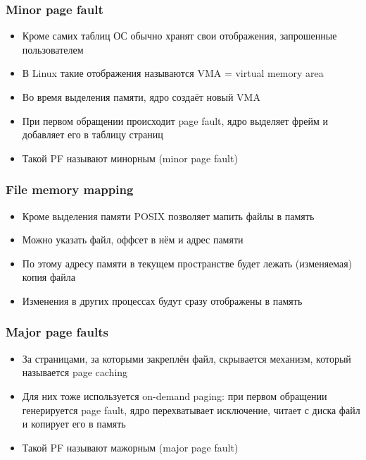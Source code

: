     \subsubsection{Minor page fault}
      \begin{itemize}
        \item Кроме самих таблиц ОС обычно хранят свои отображения, запрошенные пользователем
        \item В Linux такие отображения называются VMA = virtual memory area
        \item Во время выделения памяти, ядро создаёт новый VMA
        \item При первом обращении происходит page fault, ядро выделяет фрейм и добавляет его в таблицу страниц
        \item Такой PF называют минорным (minor page fault)
      \end{itemize}
    
    \subsubsection{File memory mapping}
      \begin{itemize}
        \item Кроме выделения памяти POSIX позволяет мапить файлы в память
        \item Можно указать файл, оффсет в нём и адрес памяти
        \item По этому адресу памяти в текущем пространстве будет лежать (изменяемая) копия файла
        \item Изменения в других процессах будут сразу отображены в память
      \end{itemize}
    
    \subsubsection{Major page faults}
      \begin{itemize}
        \item За страницами, за которыми закреплён файл, скрывается механизм, который называется page caching
        \item Для них тоже используется on-demand paging: при первом обращении генерируется page fault, ядро перехватывает исключение, читает с диска файл и копирует его в память
        \item Такой PF называют мажорным (major page fault)
      \end{itemize}
    
